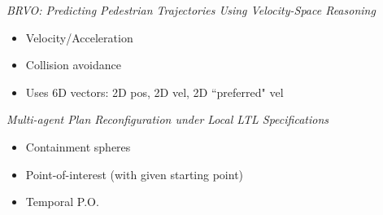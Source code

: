 \documentclass[12pt]{article}
\begin{document}
{\sl BRVO: Predicting Pedestrian Trajectories Using
Velocity-Space Reasoning}
\cite{kim2014brvo}
\begin{itemize}
  \item Velocity/Acceleration
  \item Collision avoidance
  \item Uses 6D vectors: 2D pos, 2D vel, 2D ``preferred" vel
\end{itemize}

{\sl Multi-agent Plan Reconfiguration under Local
LTL Specifications}
\cite{guo2014multi}
\begin{itemize}
  \item Containment spheres
  \item Point-of-interest (with given starting point)
  \item Temporal P.O.
\end{itemize}



\end{document}
